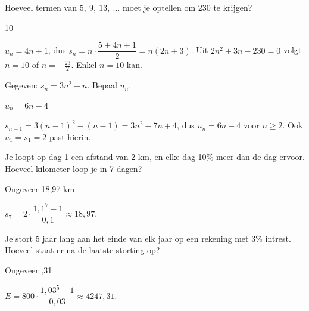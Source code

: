 \begin{oefeningen}
\begin{oefening}[2]\label{oef:h3-t6}
Hoeveel termen van $5,\ 9,\ 13,\ \ldots$ moet je optellen om 230 te krijgen?
\begin{solution}
10
\end{solution}
\begin{fullsolution}
$u_n=4n+1$, dus $s_n=n\cdot\dfrac{5+4n+1}{2}=n(2n+3)$. Uit $2n^2+3n-230=0$ volgt $n=10$ of $n=-\tfrac{23}{2}$. Enkel $n=10$ kan.
\end{fullsolution}
\end{oefening}

\begin{oefening}[2]\label{oef:h3-t7}
Gegeven: $s_n = 3n^2 - n$. Bepaal $u_n$.
\begin{solution}
$u_n=6n-4$
\end{solution}
\begin{fullsolution}
$s_{n-1}=3(n-1)^2-(n-1)=3n^2-7n+4$, dus $u_n=6n-4$ voor $n\geqslant 2$. Ook $u_1=s_1=2$ past hierin.
\end{fullsolution}
\end{oefening}

\begin{oefening}[2]\label{oef:h3-t8}
Je loopt op dag 1 een afstand van 2 km, en elke dag 10\% meer dan de dag ervoor. Hoeveel kilometer loop je in 7 dagen?
\begin{solution}
Ongeveer 18,97 km
\end{solution}
\begin{fullsolution}
$s_7=2\cdot\dfrac{1{,}1^7-1}{0{,}1}\approx 18{,}97$.
\end{fullsolution}
\end{oefening}

\begin{oefening}[2]\label{oef:h3-t9}
Je stort 5 jaar lang aan het einde van elk jaar  op een rekening met 3\% intrest. Hoeveel staat er na de laatste storting op?
\begin{solution}
Ongeveer ,31
\end{solution}
\begin{fullsolution}
$E=800\cdot\dfrac{1{,}03^5-1}{0{,}03}\approx 4247{,}31$.
\end{fullsolution}
\end{oefening}
\end{oefeningen}


